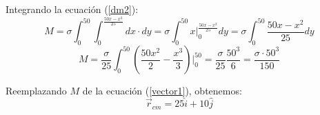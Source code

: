 \documentclass[letter,11pt]{article}
\begin{document}
Integrando la ecuación (\ref{dm2}):
\begin{equation*}
    M = \sigma \int_{0}^{50} \int_{0}^{\frac{50x - x^2}{25}} dx \cdot dy = \sigma \int_{0}^{50} x\Biggr|_{0}^{\frac{50x - x^2}{25}} dy = \sigma \int_{0}^{50} \frac{50x - x^2}{25} dy
\end{equation*}
\begin{equation*}
    M = \frac{\sigma}{25} \int_{0}^{50} \left(\frac{50 x^2}{2} - \frac{x^3}{3}\right)\Biggr|_{0}^{50} = \frac{\sigma}{25} \frac{50^3}{6} = \frac{\sigma \cdot 50^3}{150}
\end{equation*}

Reemplazando $M$ de la ecuación (\ref{vector1}), obtenemos:
\begin{equation*}
    \vec{r}_{cm} = 25 \hat{i} + 10 \hat{j}
\tag{resultado}
\end{equation*}
\end{document}
